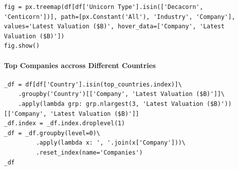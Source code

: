 \documentclass[a4paper,12pt]{article}
\begin{document}
\newpage

\begin{verbatim}
fig = px.treemap(df[df['Unicorn Type'].isin(['Decacorn', 'Centicorn'])], path=[px.Constant('All'), 'Industry', 'Company'], values='Latest Valuation ($B)', hover_data=['Company', 'Latest Valuation ($B)'])
fig.show()
\end{verbatim}
\paragraph{Top Companies accross Different Countries}
\label{sec:orgc77fa09}

\begin{verbatim}
_df = df[df['Country'].isin(top_countries.index)]\
    .groupby('Country')[['Company', 'Latest Valuation ($B)']]\
    .apply(lambda grp: grp.nlargest(3, 'Latest Valuation ($B)'))[['Company', 'Latest Valuation ($B)']]
_df.index = _df.index.droplevel(1)
_df = _df.groupby(level=0)\
         .apply(lambda x: ', '.join(x['Company']))\
         .reset_index(name='Companies')
_df
\end{verbatim}
\end{document}
